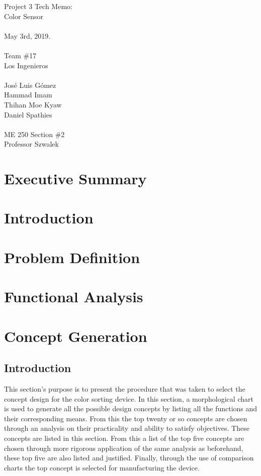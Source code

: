 \documentclass{article}
\begin{document}
\begin{center}
    \Huge{Project 3 Tech Memo: \\ Color Sensor \\~\\}
    \LARGE{  May 3rd, 2019. \\~\\ Team \#17 \\ Los Ingenieros \\~\\ José Luis Gómez \\ Hammad Imam \\ Thihan Moe Kyaw \\ Daniel Spathies \\~\\ ME 250 Section \#2 \\ Professor Szwalek}
\thispagestyle{empty}
\end{center}

\newpage

\section*{Executive Summary}

\newpage
\tableofcontents

\newpage
\section{Introduction}

\newpage
\section{Problem Definition}

\newpage
\section{Functional Analysis}

\newpage
\section{Concept Generation}
\subsection{Introduction}
This section’s purpose is to present the procedure that was taken to select the concept design for the color sorting device. In this section, a morphological chart is used to generate all the possible design concepts by listing all the functions and their corresponding means. From this the top twenty or so concepts are chosen through an analysis on their practicality and ability to satisfy objectives. These concepts are listed in this section. From this a list of the top five concepts are chosen through more rigorous application of the same analysis as beforehand, these top five are also listed and justified. Finally, through the use of comparison charts the top concept is selected for manufacturing the device. 
\end{document}
